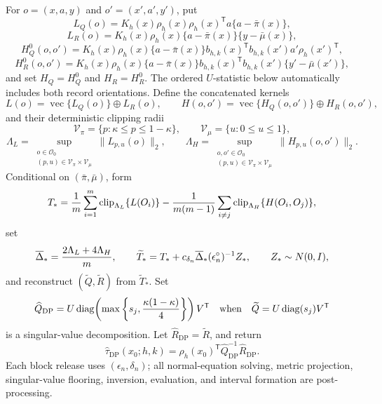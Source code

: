 For \(o=(x,a,y)\) and \(o'=(x',a',y')\), put
\[
 L_Q(o)=K_h(x)\rho_h(x)\rho_h(x)^{\mathsf T}a\{a-\bar\pi(x)\},
\]
\[
 L_R(o)=K_h(x)\rho_h(x)\{a-\bar\pi(x)\}\{y-\bar\mu(x)\},
\]
\[
 H_Q^0(o,o')=K_h(x)\rho_h(x)\{a-\bar\pi(x)\}
 b_{h,k}(x)^{\mathsf T}b_{h,k}(x')a'\rho_h(x')^{\mathsf T},
\]
\[
 H_R^0(o,o')=K_h(x)\rho_h(x)\{a-\bar\pi(x)\}
 b_{h,k}(x)^{\mathsf T}b_{h,k}(x')\{y'-\bar\mu(x')\},
\]
and set \(H_Q=H_Q^0\) and \(H_R=H_R^0\).  The ordered \(U\)-statistic below automatically includes both record orientations.  Define the concatenated kernels
\[
 L(o)=\operatorname{vec}\{L_Q(o)\}\mathbin\oplus L_R(o),
 \qquad
 H(o,o')=\operatorname{vec}\{H_Q(o,o')\}\mathbin\oplus H_R(o,o'),
\]
and their deterministic clipping radii
\[
 \mathcal V_\pi=\{p:\kappa\le p\le1-\kappa\},
 \qquad \mathcal V_\mu=\{u:0\le u\le1\},
\]
\[
 \Lambda_L=\sup_{\substack{o\in\mathcal O_0\\(p,u)\in\mathcal V_\pi\times\mathcal V_\mu}}
       \lVert L_{p,u}(o)\rVert_2,
 \qquad
 \Lambda_H=\sup_{\substack{o,o'\in\mathcal O_0\\(p,u)\in\mathcal V_\pi\times\mathcal V_\mu}}
       \lVert H_{p,u}(o,o')\rVert_2.
\]
Conditional on \((\bar\pi,\bar\mu)\), form
\[
 T_*={1\over m}\sum_{i=1}^m\operatorname{clip}_{\Lambda_L}\{L(O_i)\}
 -{1\over m(m-1)}\sum_{i\ne j}\operatorname{clip}_{\Lambda_H}\{H(O_i,O_j)\},
\]
set
\[
 \overline\Delta_*={2\Lambda_L+4\Lambda_H\over m},
 \qquad
 \widetilde T_*=T_*+c_{\delta_n}\overline\Delta_*(\epsilon_n^\circ)^{-1}Z_*,
 \qquad Z_*\sim N(0,I),
\]
and reconstruct \((\widetilde Q,\widetilde R)\) from \(\widetilde T_*\).  Set
\[
 \widehat Q_{\mathrm{DP}}
 =U\operatorname{diag}\!\left(\max\left\{s_j,
 {\kappa(1-\kappa)\over4}\right\}\right)V^{\mathsf T}
 \quad\text{when}\quad
 \widetilde Q=U\operatorname{diag}(s_j)V^{\mathsf T}
\]
is a singular-value decomposition.  Let \(\widehat R_{\mathrm{DP}}=\widetilde R\), and return
\[
 \widehat\tau_{\mathrm{DP}}(x_0;h,k)
 =\rho_h(x_0)^{\mathsf T}\widehat Q_{\mathrm{DP}}^{-1}\widehat R_{\mathrm{DP}}.
\]
Each block release uses \((\epsilon_n,\delta_n)\); all normal-equation solving, metric projection, singular-value flooring, inversion, evaluation, and interval formation are post-processing.

